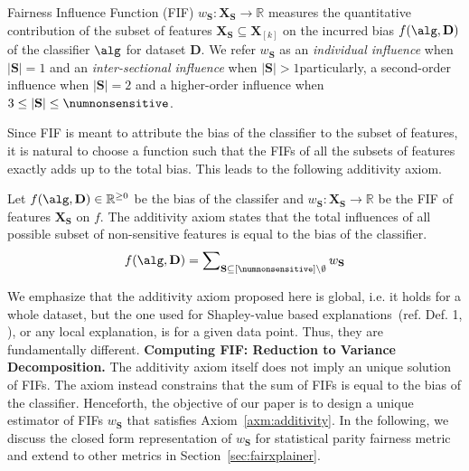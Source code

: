\begin{definition}
	Fairness Influence Function (FIF) $ w_{\mathbf{S}}:\mathbf{X}_{\mathbf{S}} \rightarrow \mathbb{R} $ measures the quantitative contribution of the subset of features $ \mathbf{X}_{\mathbf{S}} \subseteq \mathbf{X}_{[k]}$ on the incurred bias $ f(\alg, \mathbf{D}) $ of the classifier $ \alg $ for dataset $\mathbf{D}$. We refer $ w_{\mathbf{S}} $ as an \emph{individual influence} when $ |\mathbf{S}| = 1 $ and an \emph{inter-sectional influence} when $ |\mathbf{S}| > 1 $\textemdash particularly, a second-order influence when $ |\mathbf{S}| = 2 $ and a higher-order influence when $ 3 \le |\mathbf{S}| \le \numnonsensitive $. %
\end{definition}	
Since FIF is meant to attribute the bias of the classifier to the subset of features, it is natural to choose a function such that the FIFs of all the subsets of features exactly adds up to the total bias. This leads to the following additivity axiom.
\begin{axiom}
	\label{axm:additivity}
	Let $ f(\alg, \mathbf{D}) \in \mathbb{R}^{\geq 0}$ be the bias of the classifer and $ w_{\mathbf{S}}:\mathbf{X}_{\mathbf{S}} \rightarrow \mathbb{R} $ be the FIF of features $ \mathbf{X}_{\mathbf{S}} $ on $ f $. The additivity axiom states that the total influences of all possible subset of non-sensitive features is equal to the bias of the classifier.
	\begin{align}\label{eq:constraint_framework}
		f(\alg, \mathbf{D}) = \sum\nolimits_{\mathbf{S} \subseteq [\numnonsensitive] \setminus \emptyset} w_{\mathbf{S}}
	\end{align}
\end{axiom}
We emphasize that the additivity axiom proposed here is global, i.e. it holds for a whole dataset, but the one used for Shapley-value based explanations~(ref. Def. 1, \citep{lundberg2017unified}), or any local explanation, is for a given data point. Thus, they are fundamentally different.
\textbf{Computing FIF: Reduction to Variance Decomposition.} The additivity axiom itself does not imply an unique solution of FIFs. The axiom instead constrains that the sum of FIFs is equal to the bias of the classifier. Henceforth, the objective of our paper is to design a unique estimator of FIFs $ w_\mathbf{S} $ that satisfies Axiom~\ref{axm:additivity}. In the following, we discuss the closed form representation of $ w_{\mathbf{S}} $ for statistical parity fairness metric and extend to other metrics in Section~\ref{sec:fairxplainer}.


